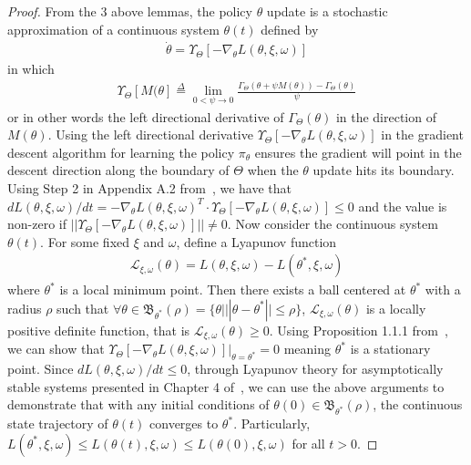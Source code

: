 \documentclass{article}
\theoremstyle{definition}
\begin{document}
\begin{proof}
From the $3$ above lemmas, the policy $\theta$ update is a stochastic approximation of a continuous system $\theta(t)$ defined by~\cite{borkar2009stochastic}
\begin{align}
\label{eqn:ThetaODE}
    \dot{\theta} = \Upsilon_\Theta[-\nabla_\theta L(\theta, \xi, \omega)]
\end{align}
in which
\begin{align*}
    \Upsilon_\Theta[M(\theta] \overset{\Delta}{=} \lim\limits_{0<\psi \to 0}\frac{\Gamma_\Theta(\theta + \psi M(\theta)) - \Gamma_\Theta(\theta)}{\psi}
\end{align*}
or in other words the left directional derivative of $\Gamma_\Theta(\theta)$ in the direction of $M(\theta)$. Using the left directional derivative $\Upsilon_\Theta[-\nabla_\theta L(\theta, \xi, \omega)]$ in the gradient descent algorithm for learning the policy $\pi_\theta$ ensures the gradient will point in the descent direction along the boundary of $\Theta$ when the $\theta$ update hits its boundary. Using Step 2 in Appendix A.2 from~\cite{chow2017risk}, we have that $dL(\theta,\xi,\omega)/dt=-\nabla_\theta L(\theta,\xi,\omega)^T\cdot\Upsilon_\Theta[-\nabla_\theta L(\theta, \xi, \omega)] \leq 0$ and the value is non-zero if $||\Upsilon_\Theta[-\nabla_\theta L(\theta, \xi, \omega)]|| \neq 0$. Now consider the continuous system $\theta(t)$. For some fixed $\xi$ and $\omega$, define a Lyapunov function
\begin{align*}
    \mathcal{L}_{\xi, \omega}(\theta) = L(\theta,\xi,\omega) - L(\theta^*, \xi, \omega)
\end{align*}
where $\theta^*$ is a local minimum point. Then there exists a ball centered at $\theta^*$ with a radius $\rho$ such that $\forall \theta\in \mathfrak{B}_{\theta^*}(\rho)=\{\theta | ||\theta - \theta^*|| \leq \rho  \}$, $\mathcal{L}_{\xi, \omega}(\theta)$ is a locally positive definite function, that is  $\mathcal{L}_{\xi, \omega}(\theta) \geq 0$. Using Proposition 1.1.1 from~\cite{bertsekas1997nonlinear}, we can show that $\Upsilon_\Theta[-\nabla_\theta L(\theta, \xi, \omega)]|_{\theta=\theta^*}=0$ meaning $\theta^*$ is a stationary point. Since $dL(\theta,\xi,\omega)/dt\leq 0$, through Lyapunov theory for asymptotically stable systems presented in Chapter 4 of~\cite{khalil2002}, we can use the above arguments to demonstrate that with any initial conditions of $\theta(0)\in \mathfrak{B}_{\theta^*}(\rho)$, the continuous state trajectory of $\theta(t)$ converges to $\theta^*$. Particularly, $L(\theta^*,\xi,\omega) \leq L(\theta(t), \xi, \omega) \leq L(\theta(0), \xi, \omega)$ for all $t>0$.


\end{proof}
\end{document}
